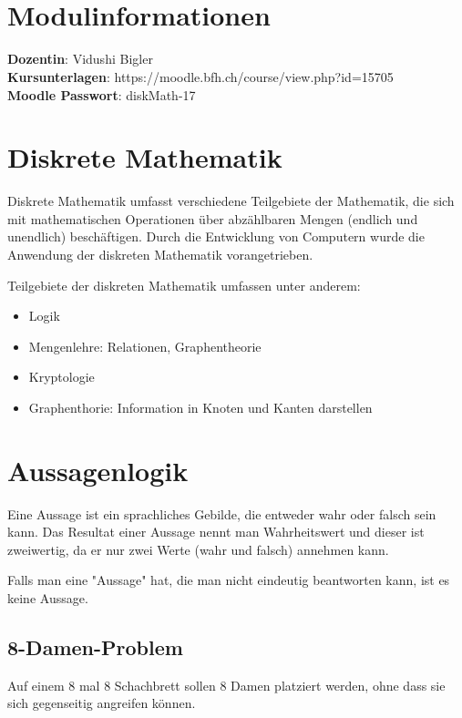 \documentclass[12pt, a4paper, oneside]{article}
\title{\vspace{-1.5cm}\subjectIdentifier{}\\\subject{}}
\author{\vspace{-1.5cm}}
\date{\vspace{-1.5cm}}
\begin{document}
\maketitle
\thispagestyle{fancy}

\section{Modulinformationen}
{\bf Dozentin}: Vidushi Bigler\\
{\bf Kursunterlagen}: https://moodle.bfh.ch/course/view.php?id=15705\\
{\bf Moodle Passwort}: diskMath-17

\newpage
\section{Diskrete Mathematik}
Diskrete Mathematik umfasst verschiedene Teilgebiete der Mathematik, die sich mit mathematischen Operationen über abzählbaren Mengen (endlich und unendlich) beschäftigen. Durch die Entwicklung von Computern wurde die Anwendung der diskreten Mathematik vorangetrieben.

Teilgebiete der diskreten Mathematik umfassen unter anderem:
\begin{itemize}
  \item Logik
  \item Mengenlehre: Relationen, Graphentheorie
  \item Kryptologie
  \item Graphenthorie: Information in Knoten und Kanten darstellen
\end{itemize}
 
\newpage
\section{Aussagenlogik}
Eine Aussage ist ein sprachliches Gebilde, die entweder wahr oder falsch sein kann. Das Resultat einer Aussage nennt man Wahrheitswert und dieser ist zweiwertig, da er nur zwei Werte (wahr und falsch) annehmen kann.

Falls man eine "Aussage" hat, die man nicht eindeutig beantworten kann, ist es keine Aussage.

\subsection{8-Damen-Problem}
Auf einem 8 mal 8 Schachbrett sollen 8 Damen platziert werden, ohne dass sie sich gegenseitig angreifen können.
\end{document}
